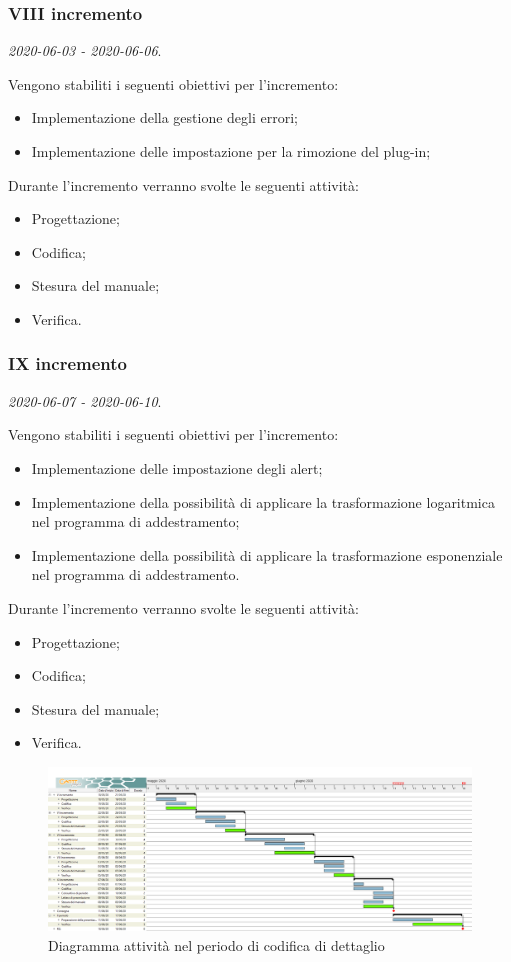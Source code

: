 \documentclass[../piano-di-progetto.tex]{subfiles}
\begin{document}
\subsubsection{VIII incremento}
\emph{2020-06-03 - 2020-06-06}. 
 
 Vengono stabiliti i seguenti obiettivi per l'incremento:
 \begin{itemize}
    \item Implementazione della gestione degli errori;
    \item Implementazione delle impostazione per la rimozione del plug-in;

 \end{itemize}

Durante l'incremento verranno svolte le seguenti attività: 
\begin{itemize}
    \item Progettazione;
    \item Codifica;
    \item Stesura del manuale;
    \item Verifica.
\end{itemize}

\subsubsection{IX incremento}
\emph{2020-06-07 - 2020-06-10}. 
 
 Vengono stabiliti i seguenti obiettivi per l'incremento:
 \begin{itemize}
    \item Implementazione delle impostazione degli alert;
    \item Implementazione della possibilità di applicare la trasformazione logaritmica nel programma di addestramento;
    \item Implementazione della possibilità di applicare la trasformazione esponenziale nel programma di addestramento.

 \end{itemize}

Durante l'incremento verranno svolte le seguenti attività: 
\begin{itemize}
    \item Progettazione;
    \item Codifica;
    \item Stesura del manuale;
    \item Verifica.
\end{itemize}



\newpage
\begin{landscape}
    \begin{figure}[H]
        \centering
        \includegraphics[width=24cm]{img/codifica.png}
        \caption{Diagramma attività nel periodo di codifica di dettaglio}
      \end{figure}
\end{landscape}
\end{document}
